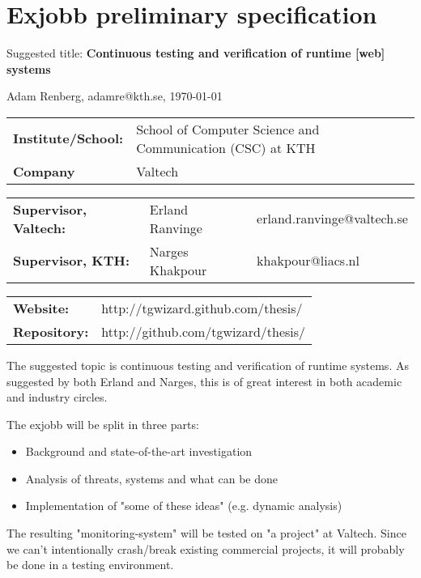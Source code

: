 \documentclass[a4paper,11pt]{kth-mag}
\begin{document}
\removepagenumbers%
\setlength\parindent{0em}
\setlength\parskip{1em}

\pagestyle{empty}


\chapter*{Exjobb preliminary specification}

Suggested title: \textbf{Continuous testing and verification of runtime [web] systems}

Adam Renberg, adamre@kth.se, \today

\begin{tabular}{lll}
	\textbf{Institute/School:} & School of Computer Science and Communication (CSC) at KTH \\
    \textbf{Company}           & Valtech \\
\end{tabular}

\begin{tabular}{lll}
	\textbf{Supervisor, Valtech:} & Erland Ranvinge & erland.ranvinge@valtech.se \\
    \textbf{Supervisor, KTH:}     & Narges Khakpour & khakpour@liacs.nl \\
\end{tabular}

\begin{tabular}{ll}
    \textbf{Website:} & http://tgwizard.github.com/thesis/ \\
    \textbf{Repository:} & http://github.com/tgwizard/thesis/ \\
\end{tabular}


The suggested topic is continuous testing and verification of runtime systems. As suggested by both Erland and Narges, this is of great interest in both academic and industry circles.

The exjobb will be split in three parts: 

\begin{itemize}
	\item Background and state-of-the-art investigation
	\item Analysis of threats, systems and what can be done
	\item Implementation of "some of these ideas" (e.g. dynamic analysis)
\end{itemize}

The resulting "monitoring-system" will be tested on "a project" at Valtech. Since we can't intentionally crash/break existing commercial projects, it will probably be done in a testing environment.
\end{document}
